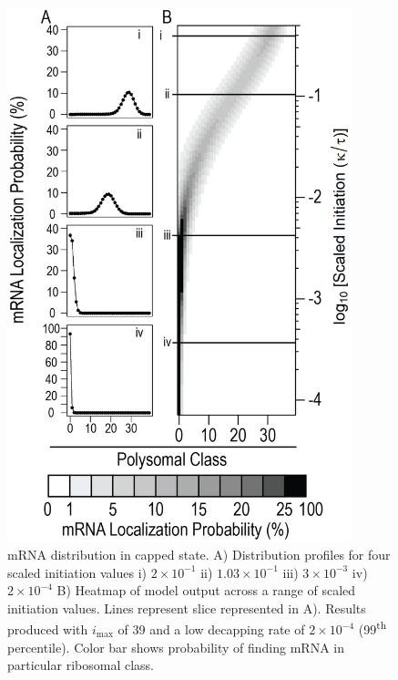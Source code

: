 \documentclass[review]{elsarticle}
\newcommand{\imax}{\ensuremath{{i_{\max}}}\xspace}
\begin{document}
\begin{enumerate}
\begin{enumerate}
\begin{figure}[!ht]
\centering
\includegraphics[width=100mm]{Images/2023-07-04_Unmarked_slices.png}
\caption{mRNA distribution in capped state. A) Distribution profiles for four scaled initiation values i) $2\times 10^{-1}$ ii) $1.03\times 10^{-1}$ iii) $3\times 10^{-3}$ iv) $2\times 10^{-4}$ B) Heatmap of model output across a range of scaled initiation values. Lines represent slice represented in A). Results produced with \imax of 39 and a low decapping rate of $2\times10^{-4}$  (99\textsuperscript{th} percentile). Color bar shows probability of finding mRNA in particular ribosomal class.}
\end{figure}
\clearpage


\end{enumerate}
\end{enumerate}
\end{document}
